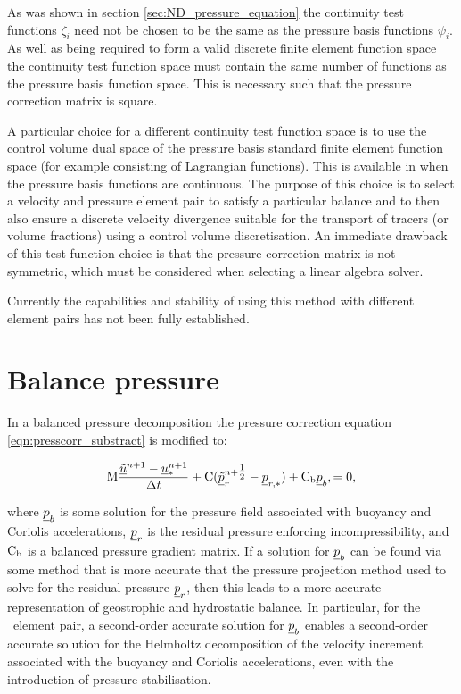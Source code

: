 As was shown in section \ref{sec:ND_pressure_equation} the continuity test functions 
$\zeta_{i}$ need not be chosen to be the same as the pressure basis functions $\psi_{i}$. 
As well as being required to form a valid discrete finite element function space the continuity 
test function space must contain the same number of functions as the pressure basis function space. 
This is necessary such that the pressure correction matrix is square. 

A particular choice for a different continuity test function space is to use the control volume dual 
space of the pressure basis standard finite element function space (for example consisting of Lagrangian 
functions). This is available in \fluidity when the pressure basis functions are continuous. The purpose of this 
choice is to select a velocity and pressure element pair to satisfy a particular balance and to 
then also ensure a discrete velocity divergence suitable for the transport of tracers (or volume fractions) 
using a control volume discretisation. An immediate drawback of this test function choice is that 
the pressure correction matrix is not symmetric, which must be considered when selecting a linear algebra solver.

Currently the capabilities and stability of using this method with different element pairs has not been fully 
established.

\section{Balance pressure}
\label{sec:balance_pressure}

In a balanced pressure decomposition the pressure correction equation \eqref{eqn:presscorr_substract}
is modified to:

\begin{equation}\label{eqn:bp_projection}
\mathrm{M}  \frac{{\underline{\tilde u}^{n+1}-\underline{u}_*^{n+1}}}{\Delta t}
    + \mathrm{C} ( \underline{\tilde p}_r^{n+\tfrac 12} - \underline{p}_{r,*}) + \mathrm{C_b} \underline{p}_b,
    =0,
\end{equation}

where $\underline{p}_b$ is some solution for the pressure field associated with buoyancy
and Coriolis accelerations, $\underline{p}_r$ is the residual pressure enforcing
incompressibility, and $\mathrm{C_b}$ is a balanced pressure
gradient matrix. If a solution for $\underline{p}_b$ can be found via some method that
is more accurate that the pressure projection method used to solve for the
residual pressure $\underline{p}_r$, then this leads to a more accurate representation of
geostrophic and hydrostatic balance. In particular, for the \Poo\
element pair, a second-order accurate solution
for $\underline{p}_b$ enables a second-order accurate solution for the Helmholtz decomposition
of the velocity increment associated with the buoyancy and Coriolis accelerations, even with the introduction of
pressure stabilisation.

